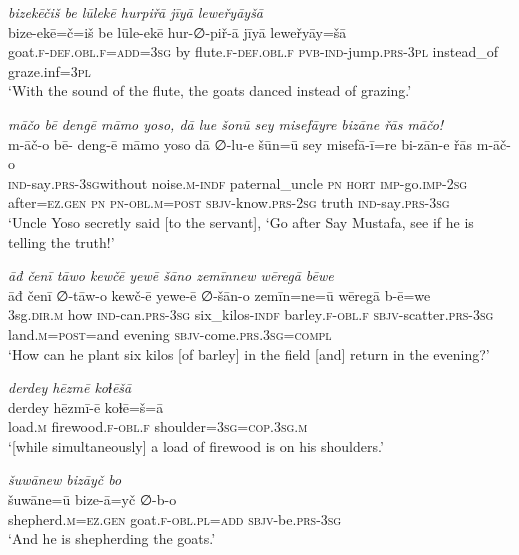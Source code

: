 \ea \label{ŽP.37}
\textit{bizekēčiš be lūlekē hurpiřā jīyā leweřyāyšā} \\ 
\gll bize-ekē=č=iš be lūle-ekē hur-∅-piř-ā jīyā leweřyāy=šā \\ 
 goat\textsc{.f}\textsc{-def}\textsc{.obl}\textsc{.f}\textsc{=add}\textsc{=3sg} by flute\textsc{.f}\textsc{-def}\textsc{.obl}\textsc{.f} \textsc{pvb-}\textsc{ind-}jump\textsc{.prs}\textsc{-3pl} instead\_of graze.inf\textsc{=3pl} \\ 
\glt `With the sound of the flute, the goats danced instead of grazing.'
\z 
 
\ea \label{ŽP.43}
\textit{māčo bē dengē māmo yoso, dā lue šonū sey misefāyre bizāne řās māčo!} \\ 
\gll m-āč-o bē- deng-ē māmo yoso dā ∅-lu-e šūn=ū sey misefā-ī=re bi-zān-e řās m-āč-o \\ 
 \textsc{ind-}say\textsc{.prs}\textsc{-3sg}without noise\textsc{.m}\textsc{-indf} paternal\_uncle \textsc{pn} \textsc{hort} \textsc{imp-}go.\textsc{imp-}\textsc{2sg} after\textsc{\textsc{=ez.gen}} \textsc{pn} \textsc{pn}\textsc{-obl}\textsc{.m}\textsc{=\textsc{post}} \textsc{sbjv-}know\textsc{.prs}-\textsc{2sg} truth \textsc{ind-}say\textsc{.prs}\textsc{-3sg} \\ 
\glt `Uncle Yoso secretly said [to the servant], ‘Go after Say Mustafa, see if he is telling the truth!'
\z 
 
\ea \label{ŽP.46}
\textit{āđ čenī tāwo kewčē yewē šāno zemīnnew wēregā bēwe} \\ 
\gll āđ čenī ∅-tāw-o kewč-ē yewe-ē ∅-šān-o zemīn=ne=ū wēregā b-ē=we \\ 
 3sg\textsc{.dir}\textsc{.m} how \textsc{ind-}can\textsc{.prs}\textsc{-3sg} six\_kilos\textsc{-indf} barley\textsc{.f}\textsc{-obl}\textsc{.f} \textsc{sbjv-}scatter\textsc{.prs}\textsc{-3sg} land\textsc{.m}\textsc{=\textsc{post}}=and evening \textsc{sbjv-}come\textsc{.prs}\textsc{.3sg}\textsc{=compl} \\ 
\glt `How can he plant six kilos [of barley] in the field [and] return in the evening?'
\z 
 
\ea \label{ŽP.47}
\textit{derdey hēzmē koɫēšā} \\ 
\gll derdey hēzmī-ē koɫē=š=ā \\ 
 load\textsc{.m} firewood\textsc{.f}\textsc{-obl}\textsc{.f} shoulder\textsc{=3sg}\textsc{=cop}\textsc{.3sg}\textsc{.m} \\ 
\glt `[while simultaneously] a load of firewood is on his shoulders.'
\z 
 
\ea \label{ŽP.48}
\textit{šuwānew bizāyč bo} \\ 
\gll šuwāne=ū bize-ā=yč ∅-b-o \\ 
 shepherd\textsc{.m}\textsc{\textsc{=ez.gen}} goat\textsc{.f}\textsc{-obl}\textsc{.pl}\textsc{=add} \textsc{sbjv-}be\textsc{.prs}\textsc{-3sg} \\ 
\glt `And he is shepherding the goats.'
\z 
 
